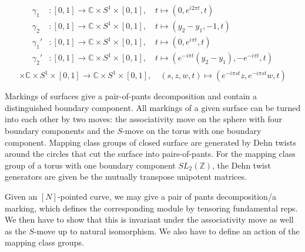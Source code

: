 \documentclass[11pt]{report}
\theoremstyle{definition}
\theoremstyle{remark}
\theoremstyle{remark}
\newcommand{\Z}{\mathbb{Z}}
\newcommand{\C}{\mathbb{C}}
\begin{document}
\begin{align*}
\gamma_1&: [0,1] \to \C \times S^1 \times [0,1], \quad t \mapsto (0,e^{i 2\pi t},t) \\
\gamma_2&: [0,1] \to \C \times S^1 \times [0,1], \quad t \mapsto (y_2-y_1,-1,t) \\
\gamma_1'&: [0,1] \to \C \times S^1 \times [0,1], \quad t \mapsto (0,e^{i \pi t},t) \\
\gamma_2'&: [0,1] \to \C \times S^1 \times [0,1], \quad t \mapsto (e^{-i \pi t} (y_2-y_1),-e^{-i \pi t},t) \\
\end{align*}
\begin{equation*}
[0,1] \times \C \times S^1 \times [0,1] \to \C \times S^1 \times [0,1], \quad (s,z,w,t) \mapsto (e^{-i \pi st}z,e^{-i \pi st} w,t)
\end{equation*}

Markings of surfaces give a pair-of-pants decomposition and contain a distinguished boundary component. All markings of a given surface can be turned into each other by two moves: the associativity move on the sphere with four boundary components and the $S$-move on the torus with one boundary component. Mapping class groups of closed surface are generated by Dehn twists around the circles that cut the surface into pairs-of-pants. For the mapping class group of a torus with one boundary component $SL_2(\Z)$, the Dehn twist generators are given be the mutually transpose unipotent matrices.

Given an $[N]$-pointed curve, we may give a pair of pants decomposition/a marking, which defines the corresponding module by tensoring fundamental reps. We then have to show that this is invariant under the associativity move as well as the $S$-move up to natural isomorphism. We also have to define an action of the mapping class groups.
\end{document}
